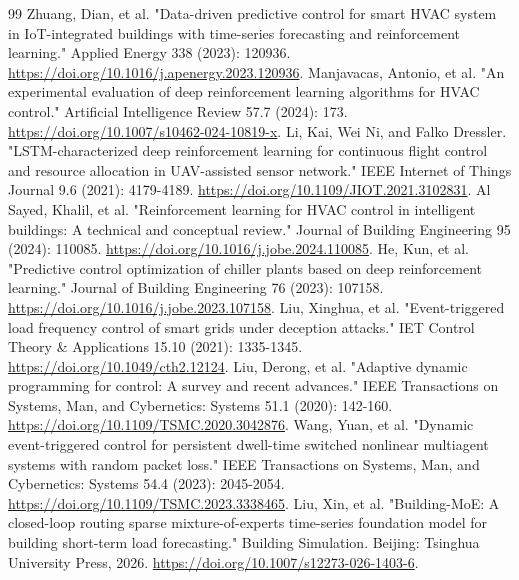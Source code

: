 ﻿\documentclass[preprint,12pt,number]{elsarticle}
\begin{document}
\begin{thebibliography}{99}
 Zhuang, Dian, et al. "Data-driven predictive control for smart HVAC system in IoT-integrated buildings with time-series forecasting and reinforcement learning." Applied Energy 338 (2023): 120936. \url{https://doi.org/10.1016/j.apenergy.2023.120936}.
 Manjavacas, Antonio, et al. "An experimental evaluation of deep reinforcement learning algorithms for HVAC control." Artificial Intelligence Review 57.7 (2024): 173. \url{https://doi.org/10.1007/s10462-024-10819-x}.
 Li, Kai, Wei Ni, and Falko Dressler. "LSTM-characterized deep reinforcement learning for continuous flight control and resource allocation in UAV-assisted sensor network." IEEE Internet of Things Journal 9.6 (2021): 4179-4189. \url{https://doi.org/10.1109/JIOT.2021.3102831}.
 Al Sayed, Khalil, et al. "Reinforcement learning for HVAC control in intelligent buildings: A technical and conceptual review." Journal of Building Engineering 95 (2024): 110085. \url{https://doi.org/10.1016/j.jobe.2024.110085}.
 He, Kun, et al. "Predictive control optimization of chiller plants based on deep reinforcement learning." Journal of Building Engineering 76 (2023): 107158. \url{https://doi.org/10.1016/j.jobe.2023.107158}.
 Liu, Xinghua, et al. "Event-triggered load frequency control of smart grids under deception attacks." IET Control Theory \& Applications 15.10 (2021): 1335-1345. \url{https://doi.org/10.1049/cth2.12124}.
 Liu, Derong, et al. "Adaptive dynamic programming for control: A survey and recent advances." IEEE Transactions on Systems, Man, and Cybernetics: Systems 51.1 (2020): 142-160. \url{https://doi.org/10.1109/TSMC.2020.3042876}.
 Wang, Yuan, et al. "Dynamic event-triggered control for persistent dwell-time switched nonlinear multiagent systems with random packet loss." IEEE Transactions on Systems, Man, and Cybernetics: Systems 54.4 (2023): 2045-2054. \url{https://doi.org/10.1109/TSMC.2023.3338465}.
 Liu, Xin, et al. "Building-MoE: A closed-loop routing sparse mixture-of-experts time-series foundation model for building short-term load forecasting." Building Simulation. Beijing: Tsinghua University Press, 2026. \url{https://doi.org/10.1007/s12273-026-1403-6}.
\end{thebibliography}
\end{document}
